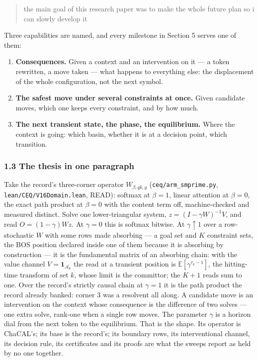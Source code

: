 \documentclass[11pt,a4paper]{article}
\theoremstyle{plain}
\theoremstyle{definition}
\theoremstyle{remark}
\providecommand{\tightlist}{%
  \setlength{\itemsep}{0pt}\setlength{\parskip}{0pt}}
\begin{document}
\begin{quote}
the main goal of this research paper was to make the whole future plan
so i can slowly develop it
\end{quote}

Three capabilities are named, and every milestone in Section 5 serves
one of them:

\begin{enumerate}
\def\labelenumi{\arabic{enumi}.}
\tightlist
\item
  \textbf{Consequences.} Given a context and an intervention on it --- a
  token rewritten, a move taken --- what happens to everything else: the
  displacement of the whole configuration, not the next symbol.
\item
  \textbf{The safest move under several constraints at once.} Given
  candidate moves, which one keeps every constraint, and by how much.
\item
  \textbf{The next transient state, the phase, the equilibrium.} Where
  the context is going: which basin, whether it is at a decision point,
  which transition.
\end{enumerate}

\subsubsection{1.3 The thesis in one
paragraph}\label{the-thesis-in-one-paragraph}

Take the record's three-corner operator \(W_{\beta,qk,g}\)
(\texttt{ceq/arm\_smprime.py}, \texttt{lean/CEQ/V16Domain.lean}, READ):
softmax at \(\beta=1\), linear attention at \(\beta=0\), the exact path
product at \(\beta=0\) with the content term off, machine-checked and
measured distinct. Solve one lower-triangular system,
\(z=(I-\gamma W)^{-1}V\), and read \(O=(1-\gamma)Wz\). At \(\gamma=0\)
this is softmax bitwise. At \(\gamma\uparrow 1\) over a row-stochastic
\(W\) with some rows made absorbing --- a goal set and \(K\) constraint
sets, the BOS position declared inside one of them because it is
absorbing by construction --- it is the fundamental matrix of an
absorbing chain: with the value channel \(V=\mathbf 1_{\mathcal A_k}\)
the read at a transient position is \(\mathbb E[\gamma^{\tau_k-1}]\),
the hitting-time transform of set \(k\), whose limit is the committor;
the \(K+1\) reads sum to one. Over the record's strictly causal chain at
\(\gamma=1\) it is the path product the record already banked: corner 3
was a resolvent all along. A candidate move is an intervention on the
context whose consequence is the difference of two solves --- one extra
solve, rank-one when a single row moves. The parameter \(\gamma\) is a
horizon dial from the next token to the equilibrium. That is the shape.
Its operator is ChaCAL's; its base is the record's; its boundary rows,
its interventional channel, its decision rule, its certificates and its
proofs are what the sweeps report as held by no one together.
\end{document}
